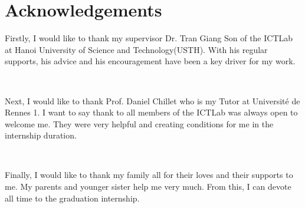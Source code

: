 \chapter*{Acknowledgements}

Firstly, I would like to thank my supervisor Dr. Tran Giang Son of the ICTLab at Hanoi University of Science and Technology(USTH). With his regular supports, his advice and his encouragement have been a key driver for my work.  

\

Next, I would like to thank Prof. Daniel Chillet who is my Tutor at Université de Rennes 1. I want to say thank to all members of the ICTLab  was always open to welcome me. They were very helpful and creating conditions for me in the internship duration.

\

Finally, I would like to thank my family all for their loves and their supports to me. My parents and younger sister help me very much. From this, I can devote all time to the graduation internship. 
